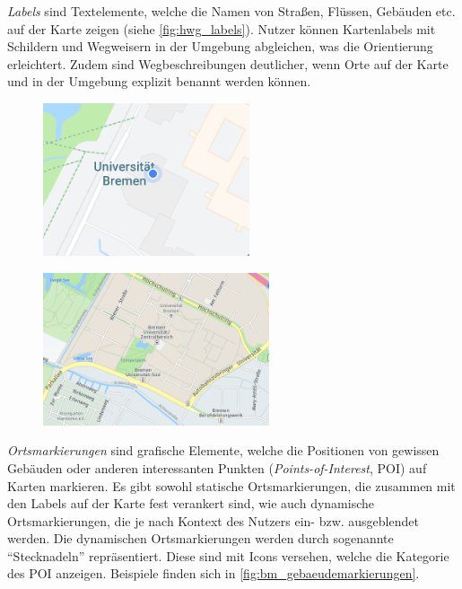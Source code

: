 \emph{Labels} sind Textelemente, welche die Namen von Straßen, Flüssen, Gebäuden etc. auf der Karte zeigen (siehe \autoref{fig:hwg_labels}).
Nutzer können Kartenlabels mit Schildern und Wegweisern in der Umgebung abgleichen, was die Orientierung erleichtert.
Zudem sind Wegbeschreibungen deutlicher, wenn Orte auf der Karte und in der Umgebung explizit benannt werden können.
\begin{figure}[h]
    \centering
    \begin{minipage}[t]{.485\textwidth}
        \centering
        \vspace{0pt}
        \includegraphics[width=\linewidth, height=4.5cm]{figures/map-app_examples/gm_positionsmarker}
        \label{fig:gm_positionsmarker}
        \vfill
    \end{minipage}
    \hfill
    \begin{minipage}[t]{.485\textwidth}
        \centering
        \vspace{0pt}
        \includegraphics[width=\linewidth, height=4.5cm]{figures/map-app_examples/hwg_labels}
        \label{fig:hwg_labels}
    \end{minipage}
\end{figure}

\emph{Ortsmarkierungen} sind grafische Elemente, welche die Positionen von gewissen Gebäuden oder anderen interessanten Punkten (\emph{Points-of-Interest}, POI) auf Karten markieren.
Es gibt sowohl statische Ortsmarkierungen, die zusammen mit den Labels auf der Karte fest verankert sind, wie auch dynamische Ortsmarkierungen, die je nach Kontext des Nutzers ein- bzw. ausgeblendet werden.
Die dynamischen Ortsmarkierungen werden durch sogenannte \enquote{Stecknadeln} repräsentiert.
Diese sind mit Icons versehen, welche die Kategorie des POI anzeigen.
Beispiele finden sich in \autoref{fig:bm_gebaeudemarkierungen}.

